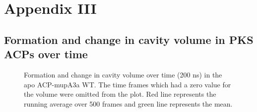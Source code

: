 \chapter{Appendix III}
\label{cha:AppendixIII}
\begin{singlespacing}


	
	\section{Formation and change in cavity volume in PKS ACPs over time}
	\label{sec:AppII:MDApoACP-mupA3a}

		\setlength\fboxsep{5pt}
		\setlength\fboxrule{1.5pt}
		\begin{figure}[htbp]
		\centering
		\caption[Formation and change in cavity volume over time (200 ns) in the apo ACP-mupA3a WT.]{Formation and change in cavity volume over time (200 ns) in the apo ACP-mupA3a WT. The time frames which had a zero value for the volume were omitted from the plot. Red line represents the running average over 500 frames and green line represents the mean.}
		\label{fig:CavityVolumeACPWild_nonzero}
		\end{figure}


\end{singlespacing}
